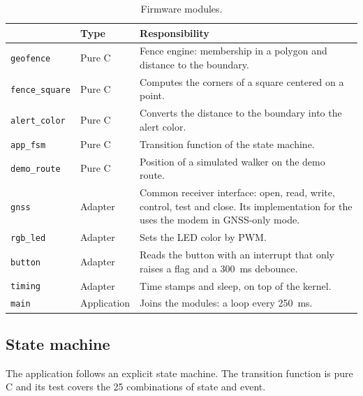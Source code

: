 \begin{table}[H]
\centering
\footnotesize
\begin{tabularx}{\textwidth}{|l l X|}
\hline
\tablehead{\textbf{Module} & \textbf{Type} & \textbf{Responsibility}} \\ \hline
\texttt{geofence} & Pure C & Fence engine: membership in a polygon and distance to the boundary. \\ \hline
\texttt{fence\_square} & Pure C & Computes the corners of a square centered on a point. \\ \hline
\texttt{alert\_color} & Pure C & Converts the distance to the boundary into the alert color. \\ \hline
\texttt{app\_fsm} & Pure C & Transition function of the state machine. \\ \hline
\texttt{demo\_route} & Pure C & Position of a simulated walker on the demo route. \\ \hline
\texttt{gnss} & Adapter & Common receiver interface: open, read, write, control, test and close. Its implementation for the \dSoc{} uses the modem in GNSS-only mode. \\ \hline
\texttt{rgb\_led} & Adapter & Sets the LED color by PWM. \\ \hline
\texttt{button} & Adapter & Reads the button with an interrupt that only raises a flag and a 300~ms debounce. \\ \hline
\texttt{timing} & Adapter & Time stamps and sleep, on top of the kernel. \\ \hline
\texttt{main} & Application & Joins the modules: a loop every 250~ms. \\ \hline
\end{tabularx}
\caption{Firmware modules.}
\end{table}

\subsection{State machine}

The application follows an explicit state machine. The transition function is pure C and its test covers the
25 combinations of state and event.

